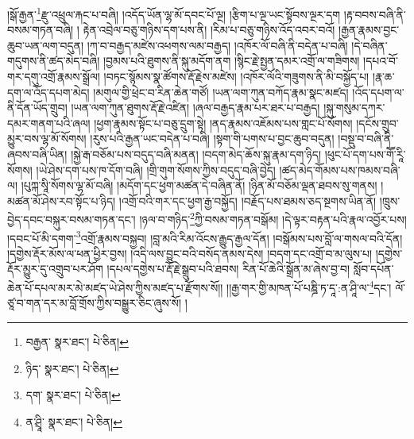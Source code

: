 །སྒོ་རྒྱན་\footnote{བརྒྱན་  སྣར་ཐང་།  པེ་ཅིན། }རྫུ་འཕྲུལ་རྐང་པ་བཞི། །འདོད་ཡོན་ལྷ་མོ་དབང་པོ་ལྔ། །རྩིག་པ་ལྔ་ཡང་སྟོབས་ལྔར་དག །རྟ་བབས་བཞི་ནི་བསམ་གཏན་བཞི། །
རྟེན་འབྲེལ་བཅུ་གཉིས་དག་པས་ནི། །རིམ་པ་བཅུ་གཉིས་འོད་འབར་བའོ། །རྒྱན་རྣམས་བྱང་ཆུབ་ཡན་ལག་བདུན། །ཀ་བ་བརྒྱད་མཛེས་འཕགས་ལམ་བརྒྱད། །འཁོར་ལོ་བཞི་ནི་བདེན་པ་བཞི། །དེ་བཞིན་གདུགས་ནི་ཚད་མེད་བཞི། །བྱམས་པའི་ཐུགས་ནི་སྐུ་མདོག་ནག །སྙིང་རྗེ་སྤྱན་དམར་འགྲོ་ལ་གཟིགས། །དཔའ་བོ་གར་དགུ་འགྲོ་རྣམས་སྒྲོལ། །བཏང་སྙོམས་སྣ་ཚོགས་རྡོ་རྗེས་མཛེས། །འཁོར་ལོའི་གཟུགས་ནི་མི་བསྐྱོད་པ། །རྣ་ཆ་དག་ལ་འོད་དཔག་མེད། །མགུལ་གྱི་ཕྲེང་བ་རིན་ཆེན་གཙོ། །ཡན་ལག་ཀུན་བཀོད་རྣམ་སྣང་མཛད། །འོད་དཔག་ལ་ནི་དོན་ཡོད་གྲུབ། །ཡན་ལག་ཀུན་ཐུགས་རྡོ་རྗེ་འཛིན། །ཞལ་བརྒྱད་རྣམ་པར་ཐར་པ་བརྒྱད། །སྐུ་གསུམ་དཀར་དམར་གནག་པའི་ཞལ། །ཕྱག་རྣམས་སྟོང་པ་བཅུ་དྲུག་སྟེ། །ནད་རྣམས་འཇོམས་པས་གླང་པོ་སོགས། །དངོས་གྲུབ་མྱུར་བས་ལྷ་མོ་སོགས། །རུས་པའི་རྒྱན་ཡང་བདེན་པ་བཞི། །སྟག་གི་པགས་པ་བྱང་ཆུབ་བདུན། །བསྡུ་བ་བཞི་ནི་ཞབས་བཞི་ཡིན། །སྐྱེ་རྒ་བཅོམ་པས་བདུད་བཞི་མནན། །བདག་མེད་ཆོས་སྐུ་རྣམ་དག་ཉིད། །ཕུང་པོ་དག་པས་གཽ་རཱི་སོགས། །ཡེ་ཤེས་དག་པས་ཁ་དོག་བཞི། །གྲི་གུག་སོགས་ཀྱིས་བདུད་བཞི་བྱེད། །ཚད་མེད་གོམས་པས་ཁམས་བཞི་ལ། །པུཀྐ་སཱི་སོགས་ལྷ་མོ་བཞི། །མདོག་དང་ཕྱག་མཚན་དེ་བཞིན་ནོ། །ཉིན་མོ་བཅོམ་ལྡན་ཐབས་སུ་གནས། །མཚན་མོ་ཤེས་རབ་སྟོང་པ་ཉིད། །འགྲོ་བའི་གར་དང་ཕྱག་རྒྱ་བསྐྱོད། །བརྗོད་པས་ཐམས་ཅད་སྔགས་ཡིན་ནོ། །ཁྲུས་བྱེད་དབང་བསྐུར་བསམ་གཏན་དང་། །ཉལ་བ་གཉིད་\footnote{ཉིད་  སྣར་ཐང་།  པེ་ཅིན། }ཀྱི་བསམ་གཏན་བསྒོམ། །དེ་ལྟར་བརྟན་པའི་རྣལ་འབྱོར་པས། །དབང་པོ་མི་དགག་\footnote{དག་  སྣར་ཐང་།  པེ་ཅིན། }འགྲོ་རྣམས་བསྐྱབ། །བླ་མའི་རིམ་འོངས་རྒྱུད་རྒྱལ་དོན། །བསྒོམས་པས་བློ་ལ་གསལ་བའི་དོན། །དགྱེས་རྡོར་མོས་ལ་ཕན་ཕྱིར་བྱས། །འདི་ལས་བྱུང་བའི་བསོད་ནམས་དེས། །བདག་དང་འགྲོ་བ་མ་ལུས་པ། །དགྱེས་རྡོར་མྱུར་དུ་འགྲུབ་པར་ཤོག །དཔལ་དགྱེས་པ་རྡོ་རྗེ་སྒྲུབ་པའི་ཐབས། རིན་པོ་ཆེའི་སྒྲོན་མ་ཞེས་བྱ་བ། སློབ་དཔོན་ཆེན་པོ་དཔལ་མར་མེ་མཛད་ཡེ་ཤེས་ཀྱིས་མཛད་པ་རྫོགས་སོ།། །།རྒྱ་གར་གྱི་མཁན་པོ་པཎྜི་ཏ་དཱ་:ན་ཤཱི་ལ་\footnote{ན་ཤྲཱི་  སྣར་ཐང་།  པེ་ཅིན། }དང་། ལོ་ཙཱ་བ་གན་དར་མ་བློ་གྲོས་ཀྱིས་བསྒྱུར་ཅིང་ཞུས་སོ། ། 